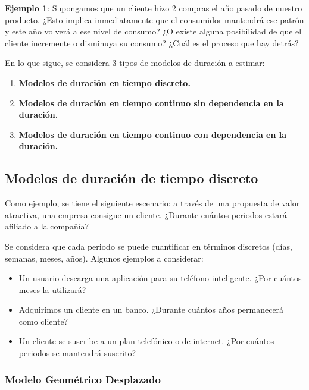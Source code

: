 \documentclass[
]{book}
\begin{document}
\textbf{Ejemplo 1}: Supongamos que un cliente hizo 2 compras el año pasado de
nuestro producto. ¿Esto implica inmediatamente que el consumidor
mantendrá ese patrón y este año volverá a ese nivel de consumo? ¿O
existe alguna posibilidad de que el cliente incremente o disminuya su
consumo? ¿Cuál es el proceso que hay detrás?

En lo que sigue, se considera 3 tipos de modelos de duración a estimar:

\begin{enumerate}
\def\labelenumi{\arabic{enumi}.}
\item
  \textbf{Modelos de duración en tiempo discreto.}
\item
  \textbf{Modelos de duración en tiempo continuo sin dependencia en la
  duración.}
\item
  \textbf{Modelos de duración en tiempo continuo con dependencia en la
  duración.}
\end{enumerate}

\subsection{Modelos de duración de tiempo discreto}\label{modelos-de-duraciuxf3n-de-tiempo-discreto}

Como ejemplo, se tiene el siguiente escenario: a través de una propuesta
de valor atractiva, una empresa consigue un cliente. ¿Durante cuántos
periodos estará afiliado a la compañía?

Se considera que cada periodo se puede cuantificar en términos discretos
(días, semanas, meses, años). Algunos ejemplos a considerar:

\begin{itemize}
\item
  Un usuario descarga una aplicación para su teléfono inteligente.
  ¿Por cuántos meses la utilizará?
\item
  Adquirimos un cliente en un banco. ¿Durante cuántos años permanecerá
  como cliente?
\item
  Un cliente se suscribe a un plan telefónico o de internet. ¿Por
  cuántos periodos se mantendrá suscrito?
\end{itemize}

\subsubsection*{Modelo Geométrico Desplazado}\label{modelo-geomuxe9trico-desplazado}
\end{document}
